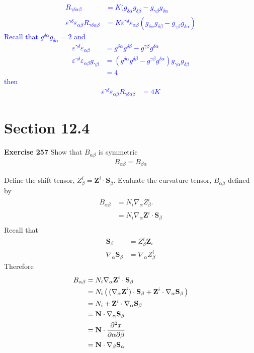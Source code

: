 \documentclass[12pt,a4paper]{report}
\newcommand{\BLUE}[1]{\textcolor{blue}{#1}}
\begin{document}
\BLUE{
\begin{align*}
	R_{\gamma\delta\alpha\beta} &= K(g_{\delta\alpha}g_{\delta\beta}-g_{\gamma\beta}g_{\delta\alpha} \\
	\varepsilon^{\gamma\delta}\varepsilon_{\alpha\beta}R_{\gamma\delta\alpha\beta} &= K	\varepsilon^{\gamma\delta}\varepsilon_{\alpha\beta}(g_{\delta\alpha}g_{\delta\beta}-g_{\gamma\beta}g_{\delta\alpha}) 
\end{align*}Recall that $g^{\delta\alpha}g_{\delta\alpha}=2$ and 
\begin{align*}
	\varepsilon^{\gamma\delta}\varepsilon_{\alpha\beta} &= 	g^{\delta\alpha}g^{\delta\beta}-g^{\gamma\beta}g^{\delta\alpha} \\
	\varepsilon^{\gamma\delta}\varepsilon_{\alpha\beta}g_{\gamma\beta} &= 	(g^{\delta\alpha}g^{\delta\beta}-g^{\gamma\beta}g^{\delta\alpha}) g_{\gamma\alpha}g_{\delta\beta} \\
	&= 4
\end{align*}then
\begin{align*}
	\varepsilon^{\gamma\delta}\varepsilon_{\alpha\beta}R_{\gamma\delta\alpha\beta} &= 4K	
\end{align*}
}


\section*{Section 12.4}
\textbf{Exercise 257} Show that $B_{\alpha\beta}$ is symmetric
\begin{align*}
	B_{\alpha\beta} = B_{\beta\alpha}
\end{align*}

Define the shift tensor, $Z^i_\beta = \textbf{Z}^i\cdot \textbf{S}_\beta$.  Evaluate the curvature tensor, $B_{\alpha\beta}$ defined by
\begin{align*}
	B_{\alpha\beta} &= N_i\nabla_\alpha Z^i_\beta. \\
		&= N_i\nabla_\alpha \textbf{Z}^i\cdot \textbf{S}_\beta \\
\end{align*}Recall that 
\begin{align*}
	\textbf{S}_\beta &= Z^i_\beta \textbf{Z}_i \\
	\nabla_\alpha \textbf{S}_\beta &= \nabla_\alpha Z^i_\beta
\end{align*}Therefore
\begin{align*}
	B_{\alpha\beta} &= N_i\nabla_\alpha \textbf{Z}^i\cdot \textbf{S}_\beta \\
		&= N_i \left (\,  (\nabla_\alpha \textbf{Z}^i)\cdot \textbf{S}_\beta + \textbf{Z}^i\cdot\nabla_\alpha \textbf{S}_\beta  \,\right ) \\
		&= N_i  + \textbf{Z}^i\cdot\nabla_\alpha \textbf{S}_\beta  \\
		&= \textbf{N}\cdot\nabla_\alpha \textbf{S}_\beta  \\
		&= \textbf{N}\cdot\frac{\partial^2 x}{\partial\alpha\partial\beta} \\
		&= \textbf{N}\cdot\nabla_\beta  \textbf{S}_\alpha \\
\end{align*}
	
\end{document}
